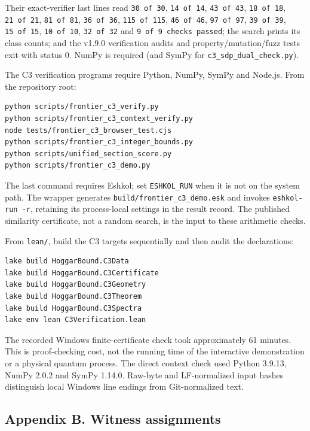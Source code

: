 \documentclass[11pt,a4paper]{article}
\begin{document}
Their exact-verifier last lines read \texttt{30\ of\ 30}, \texttt{14\ of\ 14}, \texttt{43\ of\ 43}, \texttt{18\ of\ 18}, \texttt{21\ of\ 21},
\texttt{81\ of\ 81}, \texttt{36\ of\ 36}, \texttt{115\ of\ 115}, \texttt{46\ of\ 46}, \texttt{97\ of\ 97}, \texttt{39\ of\ 39}, \texttt{15\ of\ 15}, \texttt{10\ of\ 10},
\texttt{32\ of\ 32} and \texttt{9\ of\ 9\ checks\ passed}; the search prints its class counts; and the v1.9.0 verification
audits and property/mutation/fuzz tests exit with status 0. NumPy is required (and SymPy for
\nolinkurl{c3_sdp_dual_check.py}).

The C3 verification programs require Python, NumPy, SymPy and Node.js. From the repository root:

\begin{verbatim}
python scripts/frontier_c3_verify.py
python scripts/frontier_c3_context_verify.py
node tests/frontier_c3_browser_test.cjs
python scripts/frontier_c3_integer_bounds.py
python scripts/unified_section_score.py
python scripts/frontier_c3_demo.py
\end{verbatim}

The last command requires Eshkol; set \texttt{ESHKOL\_RUN} when it is not on the system path. The wrapper
generates \nolinkurl{build/frontier_c3_demo.esk} and invokes \texttt{eshkol-run\ -r}, retaining its process-local
settings in the result record. The published similarity certificate, not a random search, is the
input to these arithmetic checks.

From \texttt{lean/}, build the C3 targets sequentially and then audit the declarations:

\begin{verbatim}
lake build HoggarBound.C3Data
lake build HoggarBound.C3Certificate
lake build HoggarBound.C3Geometry
lake build HoggarBound.C3Theorem
lake build HoggarBound.C3Spectra
lake env lean C3Verification.lean
\end{verbatim}

The recorded Windows finite-certificate check took approximately 61 minutes. This is proof-checking
cost, not the running time of the interactive demonstration or a physical quantum process. The direct
context check used Python 3.9.13, NumPy 2.0.2 and SymPy 1.14.0. Raw-byte and LF-normalized input hashes
distinguish local Windows line endings from Git-normalized text.

\subsection{Appendix B. Witness assignments}\label{appendix-b-witness-assignments}
\end{document}
